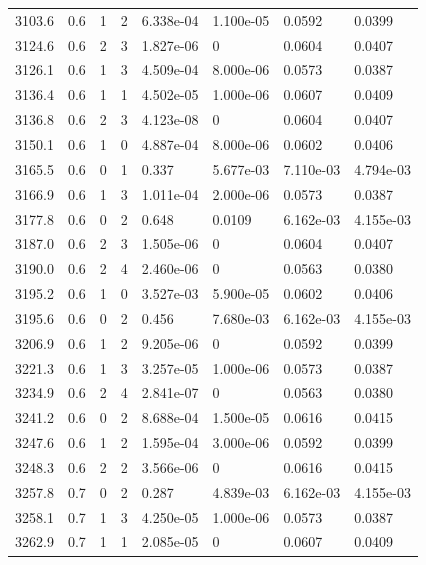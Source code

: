 \documentclass[preview]{standalone}
\begin{document}
{{{{{{{{{\begin{tabular}{L{1.2cm}C{1.2cm} C{0.3cm}C{0.5cm} C{1.4cm}C{1.4cm} C{1.4cm}C{1.4cm}}
  3103.6  &   0.6  & 1     &  2 &  6.338e-04  & 1.100e-05  & 0.0592 &  0.0399   \\ 
  3124.6  &   0.6  & 2     &  3 &  1.827e-06  & 0  & 0.0604 &  0.0407   \\ 
  3126.1  &   0.6  & 1     &  3 &  4.509e-04  & 8.000e-06  & 0.0573 &  0.0387   \\ 
  3136.4  &   0.6  & 1     &  1 &  4.502e-05  & 1.000e-06  & 0.0607 &  0.0409   \\ 
  3136.8  &   0.6  & 2     &  3 &  4.123e-08  & 0  & 0.0604 &  0.0407   \\ 
  3150.1  &   0.6  & 1     &  0 &  4.887e-04  & 8.000e-06  & 0.0602 &  0.0406   \\ 
  3165.5  &   0.6  & 0     &  1 &  0.337  & 5.677e-03  & 7.110e-03 &  4.794e-03   \\ 
  3166.9  &   0.6  & 1     &  3 &  1.011e-04  & 2.000e-06  & 0.0573 &  0.0387   \\ 
  3177.8  &   0.6  & 0     &  2 &  0.648  & 0.0109  & 6.162e-03 &  4.155e-03   \\ 
  3187.0  &   0.6  & 2     &  3 &  1.505e-06  & 0  & 0.0604 &  0.0407   \\ 
  3190.0  &   0.6  & 2     &  4 &  2.460e-06  & 0  & 0.0563 &  0.0380   \\ 
  3195.2  &   0.6  & 1     &  0 &  3.527e-03  & 5.900e-05  & 0.0602 &  0.0406   \\ 
  3195.6  &   0.6  & 0     &  2 &  0.456  & 7.680e-03  & 6.162e-03 &  4.155e-03   \\ 
  3206.9  &   0.6  & 1     &  2 &  9.205e-06  & 0  & 0.0592 &  0.0399   \\ 
  3221.3  &   0.6  & 1     &  3 &  3.257e-05  & 1.000e-06  & 0.0573 &  0.0387   \\ 
  3234.9  &   0.6  & 2     &  4 &  2.841e-07  & 0  & 0.0563 &  0.0380   \\ 
  3241.2  &   0.6  & 0     &  2 &  8.688e-04  & 1.500e-05  & 0.0616 &  0.0415   \\ 
  3247.6  &   0.6  & 1     &  2 &  1.595e-04  & 3.000e-06  & 0.0592 &  0.0399   \\ 
  3248.3  &   0.6  & 2     &  2 &  3.566e-06  & 0  & 0.0616 &  0.0415   \\ 
  3257.8  &   0.7  & 0     &  2 &  0.287  & 4.839e-03  & 6.162e-03 &  4.155e-03   \\ 
  3258.1  &   0.7  & 1     &  3 &  4.250e-05  & 1.000e-06  & 0.0573 &  0.0387   \\ 
  3262.9  &   0.7  & 1     &  1 &  2.085e-05  & 0  & 0.0607 &  0.0409   \\ 

\end{tabular}}}}}}}}}}
\end{document}

